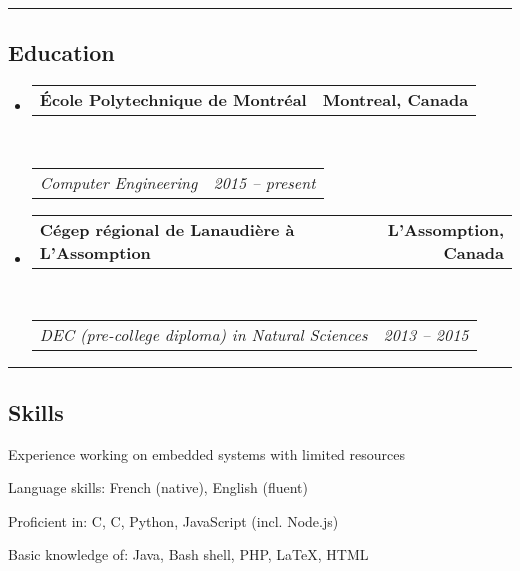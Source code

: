 \documentclass[11pt,a4paper]{article}
\makeatletter
\newenvironment{indentsection}[1]%
{\begin{list}{}%
	{\setlength{\leftmargin}{#1}}%
	\item[]%
}
{\end{list}}
\newcommand{\headerrow}[2]
{\begin{tabular*}{\linewidth}{l@{\extracolsep{\fill}}r}
	#1 &
	#2 \\
\end{tabular*}}
\newcommand{\Cplusplus}
{C\nolinebreak[4]\hspace{-.05em}\raisebox{.22ex}{\footnotesize\bf ++}}
\makeatother
\begin{document}
\hspace*{\bigskipamount}
\hrule
\subsection*{Education}

\begin{itemize}
	\parskip=0.1em

	\item 
	\headerrow
		{\textbf{École Polytechnique de Montréal}}
		{\textbf{Montreal, Canada}}
	\\
	\headerrow
		{\emph{Computer Engineering}}
		{\emph{2015 -- present}}
	
	\item 
	\headerrow
		{\textbf{Cégep régional de Lanaudière à L'Assomption}}
		{\textbf{L'Assomption, Canada}}
	\\
	\headerrow
		{\emph{DEC (pre-college diploma) in Natural Sciences}}
		{\emph{2013 -- 2015}}

\end{itemize}

\hspace*{\bigskipamount}
\hrule
\subsection*{Skills}

\begin{indentsection}{\parindent}
\begin{description*}
	\item[Experience working on embedded systems with limited resources]
	\item[Language skills:]
	French (native), English (fluent)
	\item[Proficient in:]
	C, \Cplusplus, Python, JavaScript (incl. Node.js)
	\item[Basic knowledge of:]
	Java, Bash shell, PHP, \LaTeX, HTML
\end{description*}
\end{indentsection}
\end{document}
